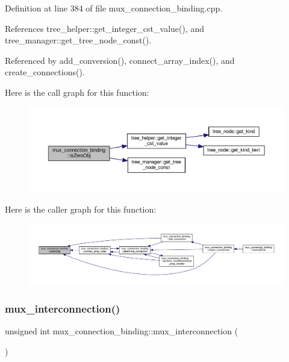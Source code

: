 Definition at line 384 of file mux\+\_\+connection\+\_\+binding.\+cpp.



References tree\+\_\+helper\+::get\+\_\+integer\+\_\+cst\+\_\+value(), and tree\+\_\+manager\+::get\+\_\+tree\+\_\+node\+\_\+const().



Referenced by add\+\_\+conversion(), connect\+\_\+array\+\_\+index(), and create\+\_\+connections().

Here is the call graph for this function\+:
\nopagebreak
\begin{figure}[H]
\begin{center}
\leavevmode
\includegraphics[width=350pt]{d7/d1e/classmux__connection__binding_af8f0423ad663b8a5fb6b9a2f96dde90c_cgraph}
\end{center}
\end{figure}
Here is the caller graph for this function\+:
\nopagebreak
\begin{figure}[H]
\begin{center}
\leavevmode
\includegraphics[width=350pt]{d7/d1e/classmux__connection__binding_af8f0423ad663b8a5fb6b9a2f96dde90c_icgraph}
\end{center}
\end{figure}
\mbox{\label{classmux__connection__binding_adfcb7df795ba15e433753c6682e44daa}} 
\subsubsection{\texorpdfstring{mux\+\_\+interconnection()}{mux\_interconnection()}}
{\footnotesize\ttfamily unsigned int mux\+\_\+connection\+\_\+binding\+::mux\+\_\+interconnection (\begin{DoxyParamCaption}{ }\end{DoxyParamCaption})\hspace{0.3cm}{\ttfamily [private]}}



